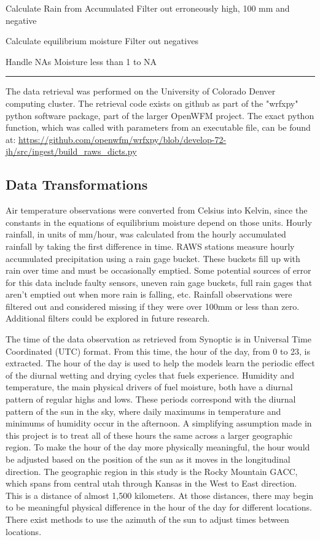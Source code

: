 

Calculate Rain from Accumulated
Filter out erroneously high, 100 mm and negative

Calculate equilibrium moisture 
Filter out negatives

Handle NAs
Moisture less than 1 to NA

\hrule

The data retrieval was performed on the University of Colorado Denver computing cluster. The retrieval code exists on github as part of the "wrfxpy" python software package, part of the larger OpenWFM project. The exact python function, which was called with parameters from an executable file, can be found at: \url{https://github.com/openwfm/wrfxpy/blob/develop-72-jh/src/ingest/build_raws_dicts.py}

\subsection*{Data Transformations}

Air temperature observations were converted from Celsius into Kelvin, since the constants in the equations of equilibrium moisture depend on those units. Hourly rainfall, in units of mm/hour, was calculated from the hourly accumulated rainfall by taking the first difference in time. RAWS stations measure hourly accumulated precipitation using a rain gage bucket. These buckets fill up with rain over time and must be occasionally emptied. Some potential sources of error for this data include faulty sensors, uneven rain gage buckets, full rain gages that aren't emptied out when more rain is falling, etc. \cite{campbell} Rainfall observations were filtered out and considered missing if they were over 100mm or less than zero. Additional filters could be explored in future research.

The time of the data observation as retrieved from Synoptic is in Universal Time Coordinated (UTC) format. From this time, the hour of the day, from 0 to 23, is extracted. The hour of the day is used to help the models learn the periodic effect of the diurnal wetting and drying cycles that fuels experience. Humidity and temperature, the main physical drivers of fuel moisture, both have a diurnal pattern of regular highs and lows. These periods correspond with the diurnal pattern of the sun in the sky, where daily maximums in temperature and minimums of humidity occur in the afternoon. A simplifying assumption made in this project is to treat all of these hours the same across a larger geographic region. To make the hour of the day more physically meaningful, the hour would be adjusted based on the position of the sun as it moves in the longitudinal direction. The geographic region in this study is the Rocky Mountain GACC, which spans from central utah through Kansas in the West to East direction. This is a distance of almost 1,500 kilometers. At those distances, there may begin to be meaningful physical difference in the hour of the day for different locations. There exist methods to use the azimuth of the sun to adjust times between locations.


